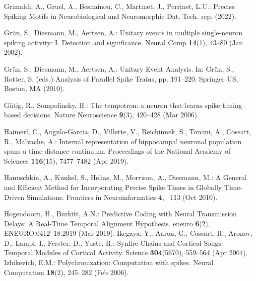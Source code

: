 \documentclass[runningheads]{llncs}
\begin{document}
{\begin{thebibliography}{10}
Grimaldi, A., Gruel, A., Besnainou, C., Martinet, J., Perrinet, L.U.: Precise
  {Spiking} {Motifs} in {Neurobiological} and {Neuromorphic} {Dat}. Tech. rep.
  (2022). %
  
Grün, S., Diesmann, M., Aertsen, A.: Unitary events in multiple single-neuron
  spiking activity: {I}. {Detection} and significance. Neural Comp
  \textbf{14}(1),  43--80 (Jan 2002). %

Grün, S., Diesmann, M., Aertsen, A.: Unitary {Event} {Analysis}. In: Grün,
  S., Rotter, S. (eds.) Analysis of {Parallel} {Spike} {Trains}, pp. 191--220.
  Springer US, Boston, MA (2010). %

Gütig, R., Sompolinsky, H.: The tempotron: a neuron that learns spike
  timing–based decisions. Nature Neuroscience  \textbf{9}(3),  420--428 (Mar
  2006). %

Haimerl, C., Angulo-Garcia, D., Villette, V., Reichinnek, S., Torcini, A.,
  Cossart, R., Malvache, A.: Internal representation of hippocampal neuronal
  population spans a time-distance continuum. Proceedings of the National
  Academy of Sciences  \textbf{116}(15),  7477--7482 (Apr 2019).
  
Hanuschkin, A., Kunkel, S., Helias, M., Morrison, A., Diesmann, M.: A {General}
  and {Efficient} {Method} for {Incorporating} {Precise} {Spike} {Times} in
  {Globally} {Time}-{Driven} {Simulations}. Frontiers in Neuroinformatics
  \textbf{4}, ~113 (Oct 2010). %

Hogendoorn, H., Burkitt, A.N.: Predictive {Coding} with {Neural} {Transmission}
  {Delays}: {A} {Real}-{Time} {Temporal} {Alignment} {Hypothesis}. eneuro
  \textbf{6}(2),  ENEURO.0412--18.2019 (Mar 2019). %
Ikegaya, Y., Aaron, G., Cossart, R., Aronov, D., Lampl, I., Ferster, D., Yuste,
  R.: Synfire {Chains} and {Cortical} {Songs}: {Temporal} {Modules} of
  {Cortical} {Activity}. Science  \textbf{304}(5670),  559--564 (Apr 2004).
Izhikevich, E.M.: Polychronization: {Computation} with spikes. Neural
  Computation  \textbf{18}(2),  245--282 (Feb 2006).


\end{thebibliography}}
\end{document}
